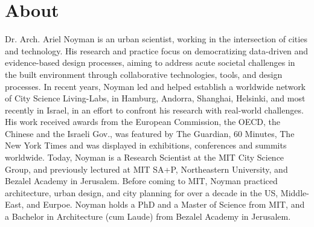 \section*{About}

 {
Dr. Arch. Ariel Noyman is an urban scientist, working in the intersection of cities and technology. His research and practice focus on democratizing data-driven and evidence-based design processes, aiming to address acute societal challenges in the built environment through collaborative technologies, tools, and design processes. In recent years, Noyman led and helped establish a worldwide network of City Science Living-Labs, in Hamburg, Andorra, Shanghai, Helsinki, and most recently in Israel, in an effort to confront his research with real-world challenges. His work received awards from the European Commission, the OECD, the Chinese and the Israeli Gov., was featured by The Guardian, 60 Minutes, The New York Times and was displayed in exhibitions, conferences and summits worldwide. Today, Noyman is a Research Scientist at the MIT City Science Group, and previously lectured at MIT SA+P, Northeastern University, and Bezalel Academy in Jerusalem. Before coming to MIT, Noyman practiced architecture, urban design, and city planning for over a decade in the US, Middle-East, and Eurpoe. Noyman holds a PhD and a Master of Science from MIT, and a Bachelor in Architecture (cum Laude) from Bezalel Academy in Jerusalem.
 }

